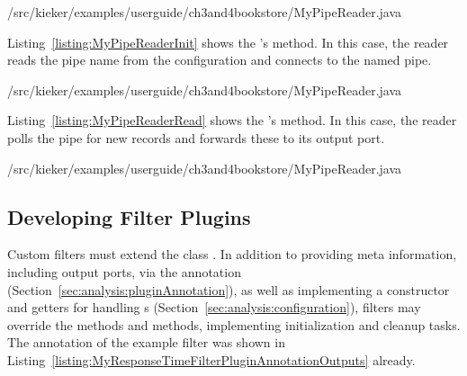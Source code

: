 % 

\setJavaCodeListing
%
{\customComponentsBookstoreApplicationDir/src/kieker/examples/userguide/ch3and4bookstore/MyPipeReader.java}

\noindent Listing~\ref{listing:MyPipeReaderInit} shows the 's %
 method. In this case, the reader reads the pipe name from the %
configuration and connects to the named pipe.

\setJavaCodeListing
%
{\customComponentsBookstoreApplicationDir/src/kieker/examples/userguide/ch3and4bookstore/MyPipeReader.java}

\pagebreak

\noindent Listing~\ref{listing:MyPipeReaderRead} shows the 's %
 method. In this case, the reader polls the pipe for new records %
and forwards these to its output port.

\setJavaCodeListing
%
{\customComponentsBookstoreApplicationDir/src/kieker/examples/userguide/ch3and4bookstore/MyPipeReader.java}

\subsection{Developing Filter Plugins}\label{sec:analysis:filters}

Custom filters must extend the class . %
In addition to providing meta information, including output ports, via the %
 annotation %
(Section~\ref{sec:analysis:pluginAnnotation}), as well as implementing a constructor %
and getters for handling s (Section~\ref{sec:analysis:configuration}), %
filters may override the methods  and %
 methods, implementing initialization and cleanup tasks. %
The  annotation of the example filter  %
was shown in Listing~\ref{listing:MyResponseTimeFilterPluginAnnotationOutputs} already.


